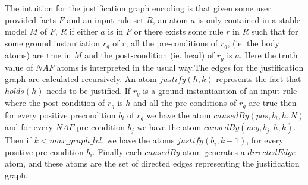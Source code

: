 \documentclass[sigconf]{acmart}
\begin{document}
The intuition for the justification graph encoding is that given some user
provided facts $F$ and an input rule set $R$, an atom $a$ is only contained in
a stable model $M$ of $F$, $R$ if either $a$ is in $F$ or there exists some
rule $r$ in $R$ such that for some ground instantiation $r_{g}$ of $r$, all
the pre-conditions of $r_{g}$, (ie. the body atoms) are true in $M$ and the
post-condition (ie. head) of $r_{g}$ is $a$. Here the truth value of $NAF$
atoms is interpreted in the usual way.The edges for the justification graph
are calculated recursively. An atom $justify(h,k)$ represents the fact that
$holds(h)$ needs to be justified. If $r_{g}$ is a ground instantiantion of an
input rule where the post condition of $r_{g}$ is $h$ and all the
pre-conditions of $r_{g}$ are true then for every positive precondition
$b_{i}$ of $r_{g}$ we have the atom $causedBy(pos,b_{i},h,N)$ and for every
$NAF$ pre-condition $b_{j}$ we have the atom $causedBy(neg,b_{j},h,k)$. Then
if $k<max\_graph\_lvl$, we have the atoms $justify(b_{i},k+1)$, for every
positive pre-condition $b_{i}$. Finally each $causedBy$ atom generates a
$directedEdge$ atom, and these atoms are the set of directed edges
representing the justification graph.
\end{document}
